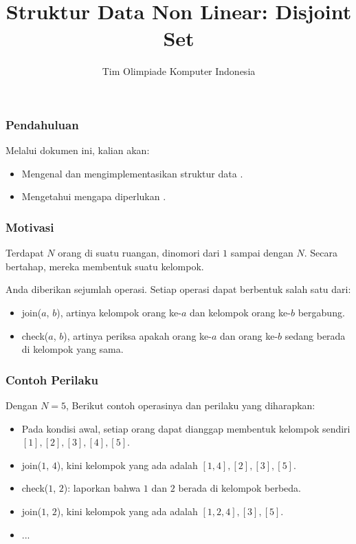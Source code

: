 

\title{Struktur Data Non Linear: \newline Disjoint Set}
\author{Tim Olimpiade Komputer Indonesia}
\date{}



\begin{frame}
\titlepage
\end{frame}

\begin{frame}
\frametitle{Pendahuluan}
Melalui dokumen ini, kalian akan:
\begin{itemize}
  \item Mengenal dan mengimplementasikan struktur data \pdjs.
  \item Mengetahui mengapa diperlukan \pdjs.
\end{itemize}
\end{frame}

\begin{frame}
\frametitle{Motivasi}
Terdapat $N$ orang di suatu ruangan, dinomori dari $1$ sampai dengan $N$. Secara bertahap, mereka membentuk suatu kelompok.\newline

Anda diberikan sejumlah operasi. Setiap operasi dapat berbentuk salah satu dari:
\begin{itemize}
  \item join($a$, $b$), artinya kelompok orang ke-$a$ dan kelompok orang ke-$b$ bergabung.
  \item check($a$, $b$), artinya periksa apakah orang ke-$a$ dan orang ke-$b$ sedang berada di kelompok yang sama.
\end{itemize}
\end{frame}

\begin{frame}
\frametitle{Contoh Perilaku}
Dengan $N=5$, Berikut contoh operasinya dan perilaku yang diharapkan:
\begin{itemize}
  \item Pada kondisi awal, setiap orang dapat dianggap membentuk kelompok sendiri $[1], [2], [3], [4], [5]$.
  \item join($1$, $4$), kini kelompok yang ada adalah $[1, 4], [2], [3], [5]$.
  \item check($1$, $2$): laporkan bahwa $1$ dan $2$ berada di kelompok berbeda.
  \item join($1$, $2$), kini kelompok yang ada adalah $[1, 2, 4], [3], [5]$.
  \item ...
\end{itemize}
\end{frame}

